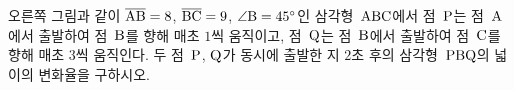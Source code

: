 \noindent\begin{minipage}[t]{0.58\linewidth}\vspace{0pt}\raggedright 오른쪽 그림과 같이 $\overline{\mathrm{AB}}=8$, $\overline{\mathrm{BC}}=9$, $\angle\mathrm{B}=45^\circ$인 삼각형~$\mathrm{ABC}$에서 점~$\mathrm{P}$는 점~$\mathrm{A}$에서 출발하여 점~$\mathrm{B}$를 향해 매초 $1$씩 움직이고, 점~$\mathrm{Q}$는 점~$\mathrm{B}$에서 출발하여 점~$\mathrm{C}$를 향해 매초 $3$씩 움직인다. 두 점~$\mathrm{P}$, $\mathrm{Q}$가 동시에 출발한 지 $2$초 후의 삼각형~$\mathrm{PBQ}$의 넓이의 변화율을 구하시오.\end{minipage}\hfill\begin{minipage}[t]{0.4\linewidth}\vspace{0pt}\centering \resizebox{\ifdim\width>\linewidth\linewidth\else\width\fi}{!}{}\end{minipage}\par
